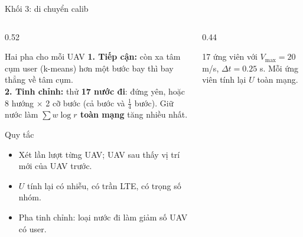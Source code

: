 \documentclass[aspectratio=169,10pt,t]{beamer}
\newcommand{\hl}[1]{\textcolor{MainBlue}{\textbf{#1}}}
\begin{document}
\begin{frame}{Khối 3: di chuyển calib}
\begin{columns}[T,onlytextwidth]
\begin{column}{0.52\textwidth}
\vspace{0pt}
  \begin{block}{Hai pha cho mỗi UAV}
    \small
    \textbf{1. Tiếp cận:} còn xa tâm cụm user (k-means) hơn một bước bay thì bay thẳng về tâm cụm.\\[2mm]
    \textbf{2. Tinh chỉnh:} thử \hl{17 nước đi}: đứng yên, hoặc 8 hướng $\times$ 2 cỡ bước (cả bước và $\tfrac14$ bước).
    Giữ nước làm \hl{$\sum w\log r$ toàn mạng} tăng nhiều nhất.
  \end{block}
  \begin{block}{Quy tắc}
    \scriptsize
    \begin{itemize}
      \item Xét lần lượt từng UAV; UAV sau thấy vị trí mới của UAV trước.
      \item $U$ tính lại có nhiễu, có trần LTE, có trọng số nhóm.
      \item Pha tinh chỉnh: loại nước đi làm giảm số UAV có user.
    \end{itemize}
  \end{block}
\end{column}
\begin{column}{0.44\textwidth}
\vspace{0pt}
  \centering

  {\scriptsize 17 ứng viên với $V_{\max}=20$ m/s, $\Delta t=0.25$ s. Mỗi ứng viên tính lại $U$ toàn mạng.}
\end{column}
\end{columns}
\end{frame}
\end{document}
